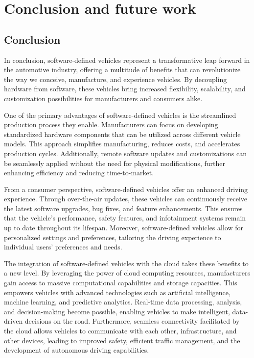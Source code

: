 \documentclass[
12pt,
oneside, 
onehalfspacing, 
nolistspacing, 
parskip, 
chapterinoneline, 
]{AASTCOMPUTER}
\begin{document}
\chapter{Conclusion and future work}
\section{Conclusion}
In conclusion, software-defined vehicles represent a transformative leap forward in the automotive industry, offering a multitude of benefits that can revolutionize the way we conceive, manufacture, and experience vehicles. By decoupling hardware from software, these vehicles bring increased flexibility, scalability, and customization possibilities for manufacturers and consumers alike.

One of the primary advantages of software-defined vehicles is the streamlined production process they enable. Manufacturers can focus on developing standardized hardware components that can be utilized across different vehicle models. This approach simplifies manufacturing, reduces costs, and accelerates production cycles. Additionally, remote software updates and customizations can be seamlessly applied without the need for physical modifications, further enhancing efficiency and reducing time-to-market.

From a consumer perspective, software-defined vehicles offer an enhanced driving experience. Through over-the-air updates, these vehicles can continuously receive the latest software upgrades, bug fixes, and feature enhancements. This ensures that the vehicle's performance, safety features, and infotainment systems remain up to date throughout its lifespan. Moreover, software-defined vehicles allow for personalized settings and preferences, tailoring the driving experience to individual users' preferences and needs.

The integration of software-defined vehicles with the cloud takes these benefits to a new level. By leveraging the power of cloud computing resources, manufacturers gain access to massive computational capabilities and storage capacities. This empowers vehicles with advanced technologies such as artificial intelligence, machine learning, and predictive analytics. Real-time data processing, analysis, and decision-making become possible, enabling vehicles to make intelligent, data-driven decisions on the road. Furthermore, seamless connectivity facilitated by the cloud allows vehicles to communicate with each other, infrastructure, and other devices, leading to improved safety, efficient traffic management, and the development of autonomous driving capabilities.
\end{document}
